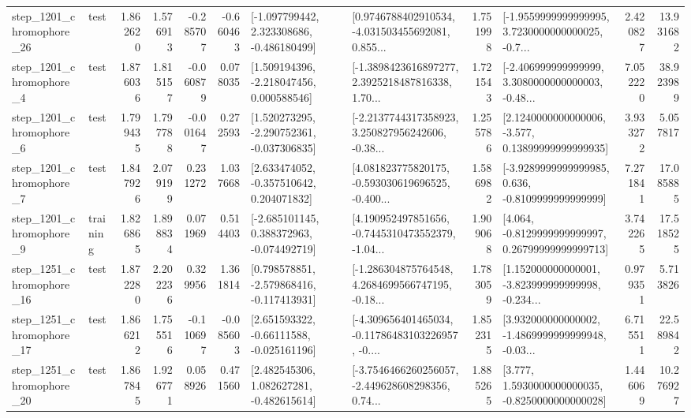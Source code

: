 \begin{tabular}{llrrrrllrlrr}
 step\_1201\_chromophore\_26 &      test &      1.862620 &    1.576913 &     -0.285707 & -0.660463 &   [-1.097799442, 2.323308686, -0.486180499] &  [0.9746788402910534, -4.031503455692081, 0.855... &       1.751998 &  [-1.9559999999999995, 3.7230000000000025, -0.7... &            2.420827 &         13.931682 \\
  step\_1201\_chromophore\_4 &      test &      1.876036 &    1.815157 &     -0.060879 &  0.078035 &    [1.509194396, -2.218047456, 0.000588546] &  [-1.3898423616897277, 2.3925218487816338, 1.70... &       1.721543 &  [-2.406999999999999, 3.3080000000000003, -0.48... &            7.052220 &         38.923989 \\
  step\_1201\_chromophore\_6 &      test &      1.799435 &    1.797788 &     -0.001647 &  0.272593 &   [1.520273295, -2.290752361, -0.037306835] &  [-2.2137744317358923, 3.250827956242606, -0.38... &       1.255786 &  [2.1240000000000006, -3.577, 0.13899999999999935] &            3.933272 &          5.057817 \\
  step\_1201\_chromophore\_7 &      test &      1.847926 &    2.079199 &      0.231272 &  1.037668 &    [2.633474052, -0.357510642, 0.204071832] &  [4.081823775820175, -0.593030619696525, -0.400... &       1.586982 &  [-3.9289999999999985, 0.636, -0.8109999999999999] &            7.271841 &         17.085885 \\
  step\_1201\_chromophore\_9 &  training &      1.826865 &    1.898834 &      0.071969 &  0.514403 &   [-2.685101145, 0.388372963, -0.074492719] &  [4.190952497851656, -0.7445310473552379, -1.04... &       1.909068 &  [4.064, -0.8129999999999997, 0.26799999999999713] &            3.742265 &         17.518525 \\
 step\_1251\_chromophore\_16 &      test &      1.872280 &    2.202236 &      0.329956 &  1.361814 &   [0.798578851, -2.579868416, -0.117413931] &  [-1.286304875764548, 4.2684699566747195, -0.18... &       1.783059 &  [1.152000000000001, -3.823999999999998, -0.234... &            0.979351 &          5.713826 \\
 step\_1251\_chromophore\_17 &      test &      1.866212 &    1.755516 &     -0.110697 & -0.085603 &    [2.651593322, -0.66111588, -0.025161196] &  [-4.309656401465034, -0.11786483103226957, -0.... &       1.852315 &  [3.932000000000002, -1.4869999999999948, -0.03... &            6.715511 &         22.589842 \\
 step\_1251\_chromophore\_20 &      test &      1.867845 &    1.926771 &      0.058926 &  0.471560 &    [2.482545306, 1.082627281, -0.482615614] &  [-3.7546466260256057, -2.449628608298356, 0.74... &       1.885265 &   [3.777, 1.5930000000000035, -0.8250000000000028] &            1.446069 &         10.276927 \\

\end{tabular}
